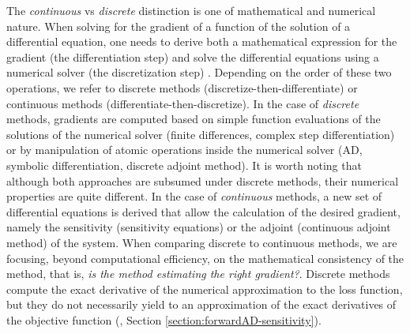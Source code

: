 The \textit{continuous} vs \textit{discrete} distinction is one of mathematical and numerical nature. 
When solving for the gradient of a function of the solution of a differential equation, one needs to derive both a mathematical expression for the gradient (the differentiation step) and solve the differential equations using a numerical solver (the discretization step) \cite{bradley2013pde, Onken_Ruthotto_2020, FATODE2014, Sirkes_Tziperman_1997}. 
Depending on the order of these two operations, we refer to discrete methods (discretize-then-differentiate) or continuous methods (differentiate-then-discretize). 
In the case of \textit{discrete} methods, gradients are computed based on simple function evaluations of the solutions of the numerical solver (finite differences, complex step differentiation) or by manipulation of atomic operations inside the numerical solver (AD, symbolic differentiation, discrete adjoint method). 
It is worth noting that although both approaches are subsumed under discrete methods, their numerical properties are quite different.
In the case of \textit{continuous} methods, a new set of differential equations is derived that allow the calculation of the desired gradient, namely the sensitivity (sensitivity equations) or the adjoint (continuous adjoint method) of the system.   
When comparing discrete to continuous methods, we are focusing, beyond computational efficiency, on the mathematical consistency of the method, that is, \textit{is the method estimating the right gradient?}. 
Discrete methods compute the exact derivative of the numerical approximation to the loss function, but they do not necessarily yield to an approximation of the exact derivatives of the objective function (\cite{Walther_2007}, Section \ref{section:forwardAD-sensitivity}). 

